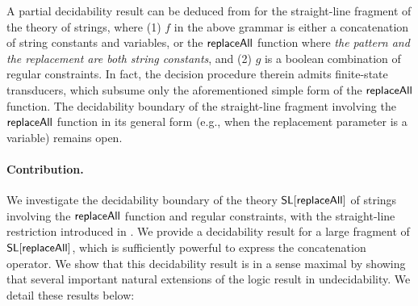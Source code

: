 A partial decidability result 
can be deduced from \cite{LB16}
for the straight-line fragment of the theory of strings, where (1) $f$ in the 
above
grammar is either a concatenation of string constants and variables, or 
the $\mathsf{replaceAll}$ function where \emph{the 
pattern and the replacement are both string constants}, and (2) $g$ is
a boolean combination of regular constraints.
In fact, the decision procedure therein admits finite-state transducers, which
subsume only the aforementioned simple form of the $\mathsf{replaceAll}$ function.
The decidability boundary of the straight-line fragment involving the 
$\mathsf{replaceAll}$ function in its general form (e.g., 
when the replacement parameter is a variable) remains open.


\paragraph{Contribution.} We investigate the decidability boundary of the theory
$\mathsf{SL}[\mathsf{replaceAll}]$ of strings involving %
the $\mathsf{replaceAll}$ function and regular constraints, with the straight-line
restriction introduced in \cite{LB16}. We provide a decidability result for a 
large fragment of $\mathsf{SL}[\mathsf{replaceAll}]$, which is sufficiently powerful to
express the concatenation operator. We show that this decidability result is in a sense maximal
by showing that several important natural extensions of the logic result in undecidability.
We detail these results below:


